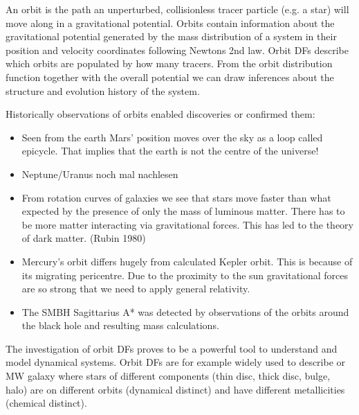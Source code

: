 \par An orbit is the path an unperturbed, collisionless tracer particle (e.g. a star) will move along in a gravitational potential. Orbits contain information about the gravitational potential generated by the mass distribution of a system in their position and velocity coordinates following Newtons 2nd law. Orbit \acp{DF} describe which orbits are populated by how many tracers. From the orbit distribution function together with the overall potential we can draw inferences about the structure and evolution history of the system. 
\par Historically observations of orbits enabled discoveries or confirmed them: 
\begin{itemize}
\item Seen from the earth Mars' position moves over the sky as a loop called epicycle. That implies that the earth is not the centre of the universe! \citep[p.3]{2006ima..book.....C}
\item Neptune/Uranus \color{red} noch mal nachlesen \color{black}
\item From rotation curves of galaxies we see that stars move faster than what expected by the presence of only the mass of luminous matter. There has to be more matter interacting via gravitational forces. This has led to the theory of dark matter. (Rubin 1980)
\item Mercury's orbit differs hugely from calculated Kepler orbit. This is because of its migrating pericentre. Due to the proximity to the sun gravitational forces are so strong that we need to apply general relativity.
\item The \ac{SMBH} Sagittarius A*  was detected by observations of the orbits around the black hole and resulting mass calculations. \citep[p.923]{2006ima..book.....C} 
\end{itemize}
\par The investigation of orbit \acp{DF} proves to be a powerful tool to understand and model dynamical systems. Orbit \acp{DF} are for example widely used to describe or \ac{MW} galaxy where stars of different components (thin disc, thick disc, bulge, halo) are on different orbits (dynamical distinct) and have different metallicities (chemical distinct).
